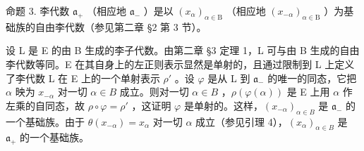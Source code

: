命题 3. 李代数 \(\mathfrak{a}_{+}\) （相应地 \(\mathfrak{a}_{-}\) ）是以 \((x_{\alpha})_{\alpha \in \mathrm{B}}\) （相应地 \((x_{-\alpha})_{\alpha \in \mathrm{B}}\) ）为基础族的自由李代数（参见第二章 §2 第 3 节）。

设 L 是 E 的由 B 生成的李子代数。由第二章 §3 定理 1，L 可与由 B 生成的自由李代数等同。E 在其自身上的左正则表示显然是单射的，且通过限制到 L 上定义了李代数 L 在 E 上的一个单射表示 \(\rho'\) 。设 \(\varphi\) 是从 L 到 \(\mathfrak{a}_{-}\) 的唯一的同态，它把 \(\alpha\) 映为 \(x_{-\alpha}\) 对一切 \(\alpha \in B\) 成立。则对一切 \(\alpha \in B\) ，\(\rho(\varphi(\alpha))\) 是 E 上用 \(\alpha\) 作左乘的自同态，故 \(\rho \circ \varphi = \rho'\) ，这证明 \(\varphi\) 是单射的。这样，\((x_{-\alpha})_{\alpha \in B}\) 是 \(\mathfrak{a}_{-}\) 的一个基础族。由于 \(\theta(x_{-\alpha}) = x_{\alpha}\) 对一切 \(\alpha\) 成立（参见引理 4），\((x_{\alpha})_{\alpha \in B}\) 是 \(\mathfrak{a}_{+}\) 的一个基础族。
\relax{}
